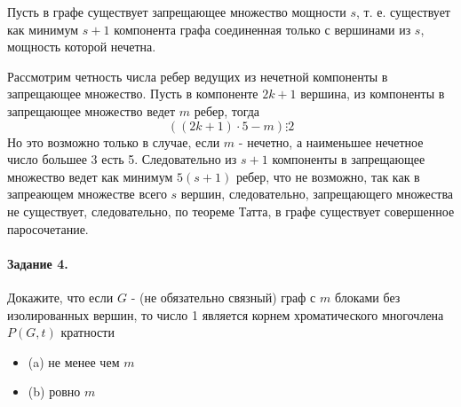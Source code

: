 \documentclass[a4paper,12pt]{article}
\begin{document}
\begin{Solution}
Пусть в графе существует запрещающее множество мощности $s$, т. е. существует как минимум $s+1$ компонента графа соединенная только с вершинами из $s$, мощность которой нечетна.

Рассмотрим четность числа ребер ведущих из нечетной компоненты в запрещающее множество. Пусть в компоненте $2k+1$ вершина, из компоненты в запрещающее множество ведет $m$ ребер, тогда
\[
	\left(\left(2k+1\right)\cdot 5 - m\right) \vdots 2
\]
Но это возможно только в случае, если $m$ - нечетно, а наименьшее нечетное число большее 3 есть 5. Следовательно из $s+1$ компоненты в запрещающее множество ведет как минимум $5 \left(s+1\right)$ ребер, что не возможно, так как в запреающем множестве всего $s$ вершин, следовательно, запрещающего множества не существует, следовательно, по теореме Татта, в графе существует совершенное паросочетание.
\end{Solution}

\paragraph{Задание 4.} Докажите, что если $G$ - (не обязательно связный) граф с $m$ блоками без изолированных вершин, то число 1 является корнем хроматического многочлена $P\left(G, t\right)$ кратности
\begin{itemize}
\item (a) не менее чем $m$

\item (b) ровно $m$
\end{itemize}
\end{document}

